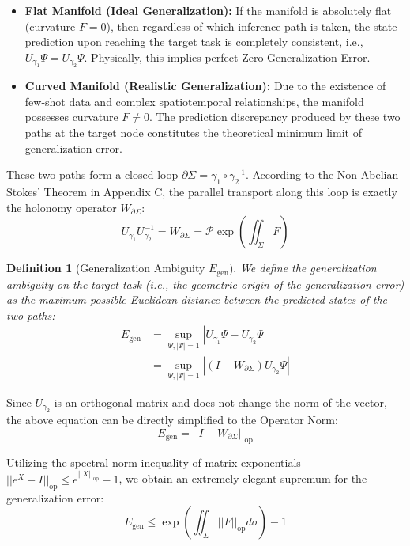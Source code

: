 \documentclass{article}
\newtheorem{definition}{Definition}[section]
\begin{document}
\begin{itemize}
    \item \textbf{Flat Manifold (Ideal Generalization):} If the manifold is absolutely flat (curvature $F=0$), then regardless of which inference path is taken, the state prediction upon reaching the target task is completely consistent, i.e., $U_{\gamma_1} \Psi = U_{\gamma_2} \Psi$. Physically, this implies perfect Zero Generalization Error.
    \item \textbf{Curved Manifold (Realistic Generalization):} Due to the existence of few-shot data and complex spatiotemporal relationships, the manifold possesses curvature $F \neq 0$. The prediction discrepancy produced by these two paths at the target node constitutes the theoretical minimum limit of generalization error.
\end{itemize}

These two paths form a closed loop $\partial\Sigma = \gamma_1 \circ \gamma_2^{-1}$. According to the Non-Abelian Stokes' Theorem in Appendix C, the parallel transport along this loop is exactly the holonomy operator $W_{\partial\Sigma}$:
\begin{equation}
U_{\gamma_1} U_{\gamma_2}^{-1} = W_{\partial\Sigma} = \mathcal{P}\exp \left( \iint_\Sigma F \right)
\end{equation}

\begin{definition}[Generalization Ambiguity $E_{\text{gen}}$]
We define the generalization ambiguity on the target task (i.e., the geometric origin of the generalization error) as the maximum possible Euclidean distance between the predicted states of the two paths:
\begin{equation}
\begin{aligned}
E_{\text{gen}} &= \sup_{\Psi, |\Psi|=1} |U_{\gamma_1} \Psi - U_{\gamma_2} \Psi| \\
&= \sup_{\Psi, |\Psi|=1} |(I - W_{\partial\Sigma}) U_{\gamma_2} \Psi|
\end{aligned}
\end{equation}
\end{definition}

Since $U_{\gamma_2}$ is an orthogonal matrix and does not change the norm of the vector, the above equation can be directly simplified to the Operator Norm:
\begin{equation}
E_{\text{gen}} = ||I - W_{\partial\Sigma}||_{\text{op}}
\end{equation}

Utilizing the spectral norm inequality of matrix exponentials $||e^X - I||_{\text{op}} \leq e^{||X||_{\text{op}}} - 1$, we obtain an extremely elegant supremum for the generalization error:
\begin{equation}
E_{\text{gen}} \leq \exp \left( \iint_\Sigma ||F||_{\text{op}} d\sigma \right) - 1
\end{equation}
\end{document}
